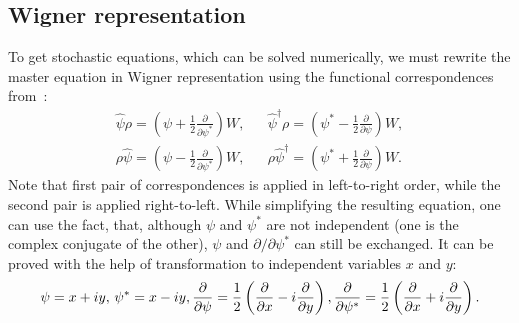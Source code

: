 \documentclass[12pt,notitlepage]{report}
\begin{document}
\subsection*{Wigner representation}

To get stochastic equations, which can be solved numerically,
we must rewrite the master equation in Wigner representation using the functional correspondences
from~\cite{gardiner_quantum_noise}:
\begin{align*}
\hat{\psi} \rho = \left( \psi + \frac{1}{2} \frac{\partial}{\partial \psi^*} \right) W, & &
\hat{\psi}^\dagger \rho = \left( \psi^* - \frac{1}{2} \frac{\partial}{\partial \psi} \right) W, \\
\rho \hat{\psi} = \left( \psi - \frac{1}{2} \frac{\partial}{\partial \psi^*} \right) W, & &
\rho \hat{\psi}^\dagger = \left( \psi^* + \frac{1}{2} \frac{\partial}{\partial \psi} \right) W.
\end{align*}
Note that first pair of correspondences is applied in left-to-right order, while the second pair is applied right-to-left.
While simplifying the resulting equation, one can use the fact, that, although $\psi$ and $\psi^*$ are not independent
(one is the complex conjugate of the other), $\psi$ and $\partial/\partial\psi^*$ can still be exchanged.
It can be proved with the help of transformation to independent variables $x$ and $y$:
\[
\psi = x + iy,\, \psi^* = x - iy,\, \\
\frac{\partial}{\partial\psi} = \frac{1}{2} \left( \frac{\partial}{\partial x} - i \frac{\partial}{\partial y} \right),\, \\
\frac{\partial}{\partial\psi^*} = \frac{1}{2} \left( \frac{\partial}{\partial x} + i \frac{\partial}{\partial y} \right).
\]
\end{document}
